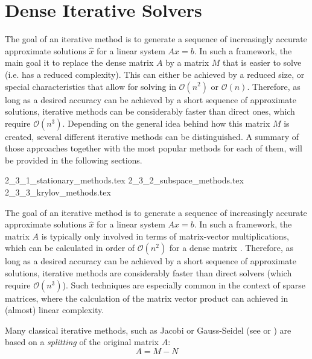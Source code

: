 \section{Dense Iterative Solvers}
\label{sec:iterative_solvers}

The goal of an iterative method is to generate a sequence of increasingly accurate approximate solutions $\hat{x}$ for a linear system $Ax=b$. In such a framework, the main goal it to replace the dense matrix $A$ by a matrix $M$ that is easier to solve (i.e. has a reduced complexity). This can either be achieved by a reduced size, or special characteristics that allow for solving in $\mathcal{O}(n^2)$ or $\mathcal{O}(n)$. Therefore, as long as a desired accuracy can be achieved by a short sequence of approximate solutions, iterative methods can be considerably faster than direct ones, which require $\mathcal{O}(n^3)$. Depending on the general idea behind how this matrix $M$ is created, several different iterative methods can be distinguished. A summary of those approaches together with the most popular methods for each of them, will be provided in the following sections.

{2_3_1_stationary_methods.tex}
{2_3_2_subspace_methods.tex}
{2_3_3_krylov_methods.tex}

\newpage


The goal of an iterative method is to generate a sequence of increasingly accurate approximate solutions $\hat{x}$ for a linear system $Ax=b$. In such a framework, the matrix $A$ is typically only involved in terms of matrix-vector multiplications, which can be calculated in order of $\mathcal{O}(n^2)$ for a dense matrix \cite{golub_matrix_2013}. Therefore, as long as a desired accuracy can be achieved by a short sequence of approximate solutions, iterative methods are considerably faster than direct solvers (which require $\mathcal{O}(n^3)$). Such techniques are especially common in the context of sparse matrices, where the calculation of the matrix vector product can achieved in (almost) linear complexity.

Many classical iterative methods, such as Jacobi or Gauss-Seidel (see \cite{golub_matrix_2013} or \cite{saad_iterative_2003}) are based on a \textit{splitting} of the original matrix $A$:
\begin{equation}
\label{eqn:splitting}
    A = M - N
\end{equation}

